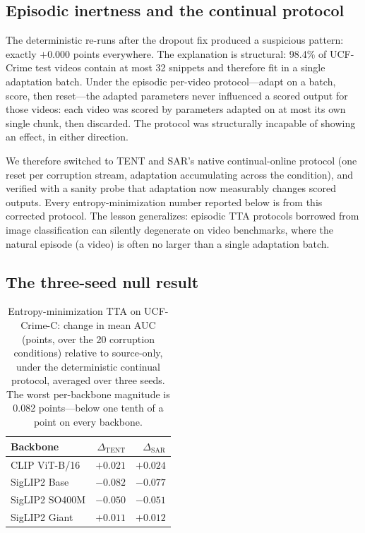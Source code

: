 \subsection{Episodic inertness and the continual protocol}

The deterministic re-runs after the dropout fix produced a suspicious
pattern: exactly $+0.000$ points everywhere. The explanation is structural:
98.4\% of UCF-Crime test videos contain at most 32 snippets and therefore fit
in a single adaptation batch. Under the episodic per-video protocol---adapt
on a batch, score, then reset---the adapted parameters never influenced a
scored output for those videos: each video was scored by parameters adapted
on at most its own single chunk, then discarded. The protocol was
structurally incapable of showing an effect, in either direction.

We therefore switched to TENT and SAR's native continual-online protocol
(one reset per corruption stream, adaptation accumulating across the
condition), and verified with a sanity probe that adaptation now measurably
changes scored outputs. Every entropy-minimization number reported below is
from this corrected protocol. The lesson generalizes: episodic TTA protocols
borrowed from image classification can silently degenerate on video
benchmarks, where the natural episode (a video) is often no larger than a
single adaptation batch.

\subsection{The three-seed null result}

\begin{table}[t]
\centering
\caption[Entropy-minimization TTA null result on UCF-Crime-C]{Entropy-minimization TTA on UCF-Crime-C: change in mean AUC (points,
over the 20 corruption conditions) relative to source-only, under the
deterministic continual protocol, averaged over three seeds. The worst
per-backbone magnitude is 0.082 points---below one tenth of a point on every
backbone.}
\label{tab:tent-sar-null}
\begin{tabular}{lrr}
\toprule
Backbone & $\Delta_{\text{TENT}}$ & $\Delta_{\text{SAR}}$ \\
\midrule
CLIP ViT-B/16 & $+0.021$ & $+0.024$ \\
SigLIP2 Base & $-0.082$ & $-0.077$ \\
SigLIP2 SO400M & $-0.050$ & $-0.051$ \\
SigLIP2 Giant & $+0.011$ & $+0.012$ \\
\bottomrule
\end{tabular}
\end{table}

